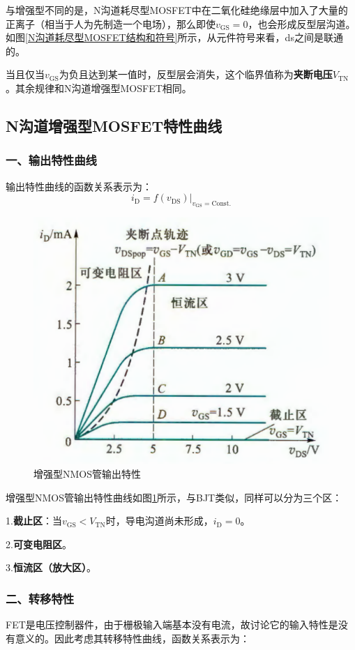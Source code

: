 与增强型不同的是，N沟道耗尽型MOSFET中在二氧化硅绝缘层中加入了大量的正离子（相当于人为先制造一个电场），那么即使$v_{\mathrm{GS}}=0$，也会形成反型层沟道。如图\ref{N沟道耗尽型MOSFET结构和符号}所示，从元件符号来看，ds之间是联通的。

当且仅当$v_{\mathrm{GS}}$为负且达到某一值时，反型层会消失，这个临界值称为\textbf{夹断电压}$V_{\mathrm{TN}}$。其余规律和N沟道增强型MOSFET相同。

\subsection{N沟道增强型MOSFET特性曲线}
\subsubsection{一、输出特性曲线}
输出特性曲线的函数关系表示为：
\begin{equation}
    i_\mathrm{D}=f(v_{\mathrm{DS}})|_{v_{\mathrm{GS}}=\mathrm{Const.}}
\end{equation}

\begin{figure}[htb]
    \centering
    \includegraphics[width=0.45\linewidth]{pic/增强型NMOS管输出特性.png}
    \caption{增强型NMOS管输出特性\cite{康华光}\label{增强型NMOS管输出特性}}
\end{figure}

增强型NMOS管输出特性曲线如图\ref{增强型NMOS管输出特性}所示，与BJT类似，同样可以分为三个区：

1.\textbf{截止区}：当$v_{\mathrm{GS}}<V_{\mathrm{TN}}$时，导电沟道尚未形成，$i_\mathrm{D}=0$。

2.\textbf{可变电阻区}。

3.\textbf{恒流区（放大区）}。

\subsubsection{二、转移特性}
FET是电压控制器件，由于栅极输入端基本没有电流，故讨论它的输入特性是没有意义的。因此考虑其转移特性曲线，函数关系表示为：

